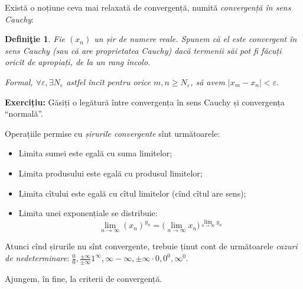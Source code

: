 \documentclass[11pt,a4paper]{article}
\newcommand\qq{\enquote}
\theoremstyle{dotless}
\theoremstyle{dotlessdr}
\newtheorem{definition}{Defini\c{t}ie}[section]
\begin{document}
Există o noțiune ceva mai relaxată de convergență, numită \emph{convergență în sens Cauchy}:

\begin{definition}\label{def:cauchy}
  Fie $(x_n)$ un șir de numere reale. Spunem că el este \emph{convergent în sens Cauchy} (sau că are %
  proprietatea Cauchy) dacă termenii săi pot fi făcuți oricît de apropiați, de la un rang încolo.

  Formal, $\forall \varepsilon, \exists N_\varepsilon$ astfel încît pentru orice $m, n \geq N_\varepsilon$,
  să avem $|x_m - x_n| < \varepsilon$.
\end{definition}

\textbf{Exercițiu:} Găsiți o legătură între convergența în sens Cauchy și convergența \qq{normală}.

Operațiile permise cu \emph{șirurile convergente} sînt următoarele:
\begin{itemize}
  \item Limita sumei este egală cu suma limitelor;
  \item Limita produsului este egală cu produsul limitelor;
  \item Limita cîtului este egală cu cîtul limitelor (cînd cîtul are sens);
  \item Limita unei exponențiale se distribuie:
    \[
      \lim_{n \to \infty} (x_n)^{y_n} = \Big( \lim_{n \to \infty} x_n \Big)^{\lim_{n \to \infty} y_n}
    \]
\end{itemize}

Atunci cînd șirurile nu sînt convergente, trebuie ținut cont de următoarele
\emph{cazuri de nedeterminare}: $\frac{0}{0}, \frac{\pm\infty}{\pm\infty} 1^\infty, \infty - \infty, \pm\infty \cdot 0, %
0^0, \infty^0$.


Ajungem, în fine, la criterii de convergență.
\end{document}
